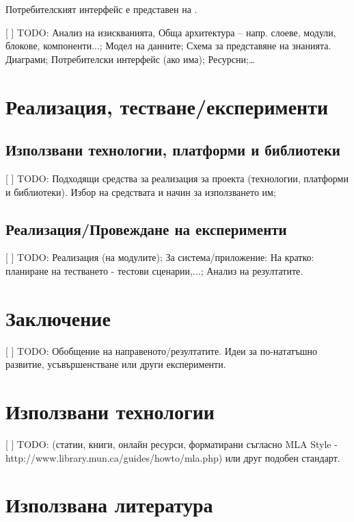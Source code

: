 \documentclass[12pt]{article}
\begin{document}
    Потребителският интерфейс е представен на .
    
    
    [ ] TODO: Анализ на изискванията, Обща архитектура – напр. слоеве, модули, блокове, компоненти...; Модел на данните; Схема за представяне на знанията. Диаграми; Потребителски интерфейс (ако има); Ресурсни;…
    
\section{Реализация, тестване/експерименти}

\subsection{Използвани технологии, платформи и библиотеки}

[ ] TODO: Подходящи средства за реализация за проекта (технологии, платформи и библиотеки). Избор на средствата и начин за използването им;

\subsection{Реализация/Провеждане на експерименти}

[ ] TODO: Реализация (на модулите); 
За система/приложение: На кратко: планиране на тестването - тестови сценарии,...; Анализ на резултатите.

\section{Заключение}

[ ] TODO: Обобщение на направеното/резултатите. 
Идеи за по-нататъшно развитие, усъвършенстване или други експерименти.

\section{Използвани технологии}

[ ] TODO: (статии, книги, онлайн ресурси, форматирани съгласно MLA Style - http://www.library.mun.ca/guides/howto/mla.php) или друг подобен стандарт.


\section{Използвана литература}


\listoffigures
\end{document}

